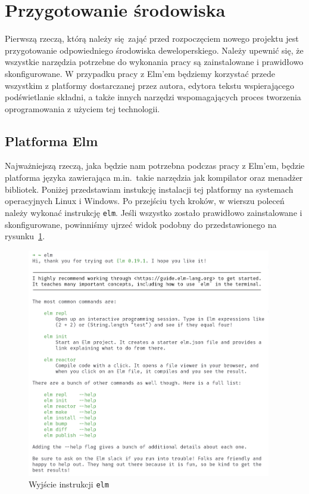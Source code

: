 \documentclass[twoside,a4paper]{report}
\begin{document}
\section{Przygotowanie środowiska}
Pierwszą rzeczą, którą należy się zająć przed rozpoczęciem nowego projektu jest przygotowanie odpowiedniego środowiska deweloperskiego.
Należy upewnić się, że wszystkie narzędzia potrzebne do wykonania pracy są zainstalowane i prawidłowo skonfigurowane.
W przypadku pracy z Elm'em będziemy korzystać przede wszystkim z platformy dostarczanej przez autora, edytora tekstu wspierającego podświetlanie składni, a także innych narzędzi wspomagających proces tworzenia oprogramowania z użyciem tej technologii.

\subsection{Platforma Elm}
Najważniejszą rzeczą, jaka będzie nam potrzebna podczas pracy z Elm'em, będzie platforma języka zawierająca m.in.~takie narzędzia jak kompilator oraz menadżer bibliotek.
Poniżej przedstawiam instukcję instalacji tej platformy na systemach operacyjnych Linux i Windows. Po przejściu tych kroków, w wierszu poleceń należy wykonać instrukcję \texttt{elm}.
Jeśli wszystko zostało prawidłowo zainstalowane i skonfigurowane, powinniśmy ujrzeć widok podobny do przedstawionego na rysunku~\ref{fig:elm_output}.
\begin{figure}[H]
    \centering
    \includegraphics[width=0.95\textwidth]{elm_output.png}
    \caption{Wyjście instrukcji \texttt{elm}}\label{fig:elm_output}
\end{figure}
\end{document}
